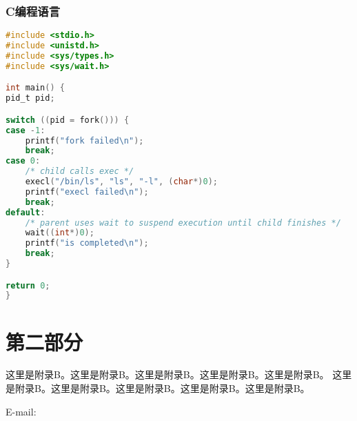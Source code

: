 \subsubsection{C编程语言}

\begin{lstlisting}[language=c]
#include <stdio.h>
#include <unistd.h>
#include <sys/types.h>
#include <sys/wait.h>

int main() {
pid_t pid;

switch ((pid = fork())) {
case -1:
    printf("fork failed\n");
    break;
case 0:
    /* child calls exec */
    execl("/bin/ls", "ls", "-l", (char*)0);
    printf("execl failed\n");
    break;
default:
    /* parent uses wait to suspend execution until child finishes */
    wait((int*)0);
    printf("is completed\n");
    break;
}

return 0;
}
\end{lstlisting}


\newpage

\section{第二部分}

这里是附录B。这里是附录B。这里是附录B。这里是附录B。这里是附录B。
这里是附录B。这里是附录B。这里是附录B。这里是附录B。这里是附录B。

E-mail: 
